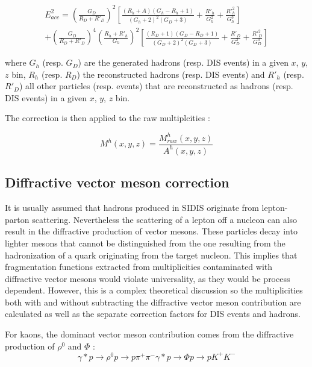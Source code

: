 \documentclass[letterpaper,12pt]{article}
\begin{document}
\begin{equation}
  \begin{split}
    E^2_{acc} = \left (\frac{G_D}{R_D+R'_{D}}\right )^2\left [\frac{(R_h+A)(G_h-R_h+1)}{(G_h+2)^2(G_D+3)}+\frac{R'_{h}}{G^2_h}+\frac{R'^2_h}{G^3_h}\right ] \\
                + \left (\frac{G_D}{R_D+R'_{D}}\right )^4\left (\frac{R_h+R'_h}{G_h}\right )^2\left [\frac{(R_D+1)(G_D-R_D+1)}{(G_D+2)^2(G_D+3)}+\frac{R'_D}{G^2_D}+\frac{R'^2_D}{G^3_D}\right ]
  \end{split}
\end{equation}

where $G_h$ (resp. $G_D$) are the generated hadrons (resp. DIS events) in a given $x$, $y$, $z$ bin, $R_h$ (resp. $R_D$) the reconstructed
hadrons (resp. DIS events) and $R'_h$ (resp. $R'_D$) all other particles (resp. events) that are reconstructed as hadrons (resp. DIS events)
in a given $x$, $y$, $z$ bin.

The correction is then applied to the raw multiplcities :

\begin{equation}
  M^h(x,y,z) = \frac{M^h_{raw}(x,y,z)}{A^h(x,y,z)}
\end{equation}

\subsection{Diffractive vector meson correction}

It is usually assumed that hadrons produced in SIDIS originate from lepton-parton scattering. Nevertheless the scattering of a lepton
off a nucleon can also result in the diffractive production of vector mesons. These particles decay into lighter mesons that cannot be
distinguished from the one resulting from the hadronization of a quark originating from the target nucleon. This implies that fragmentation
functions extracted from multiplicities contaminated with diffractive vector mesons would violate universality, as they would be process
dependent. However, this is a complex theoretical discussion so the multiplicities both with and without subtracting the diffractive vector
meson contribution are calculated as well as the separate correction factors for DIS events and hadrons.

For kaons, the dominant vector meson contribution comes from the diffractive production of $\rho^0$ and $\Phi$ :
\begin{equation}
    \gamma * p \rightarrow \rho^0 p \rightarrow p\pi^+\pi^-
    \gamma * p \rightarrow \Phi p \rightarrow pK^+K^-
\end{equation}
\end{document}
